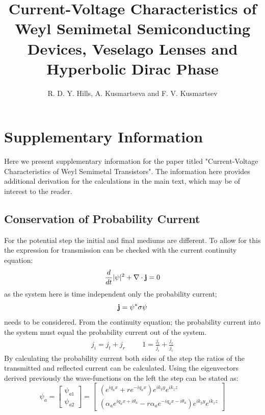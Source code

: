 \documentclass[12pt,a4paper]{article}
\title{Current-Voltage Characteristics of Weyl Semimetal Semiconducting Devices, Veselago Lenses and Hyperbolic Dirac Phase}
\author{R. D. Y. Hills, A. Kusmartseva and F. V. Kusmartsev}
\begin{document}
\maketitle
	\section{Supplementary Information}
	Here we present supplementary information for the paper titled "Current-Voltage Characteristics of Weyl Semimetal Transistors". The information here provides additional derivation for the calculations in the main text, which may be of interest to the reader.
		\subsection{Conservation of Probability Current}
		\label{Potential Step - Conservation of Probability Current}
			For the potential step the initial and final mediums are different. To allow for this the expression for transmission can be checked with the current continuity equation:
		\begin{equation}
			\frac{d}{dt}|\psi|^{2}+\nabla\cdot {\bf j}=0
		\end{equation}
		as the system here is time independent only the probability current;
		\begin{equation}
			{\bf j} =\psi^{*} {\bf \sigma} \psi
		\end{equation}
		needs to be considered. From the continuity equation; the probability current into the system must equal the probability current out of the system.
		\begin{align}
			j_{i}=j_{t}+j_{r}
			\hspace{1cm}
			1=\frac{j_{t}}{j_{i}}+\frac{j_{r}}{j_{i}}
		\end{align}
		By calculating the probability current both sides of the step the ratios of the transmitted and reflected current can be calculated. Using the eigenvectors derived previously the wave-functions on the left the step can be stated as:
		\begin{equation}
			\psi_{a}=
			\left[\begin{array}{ccc}
				\psi_{a1}\\
				\psi_{a2}
			\end{array}\right]
			=
			\left[\begin{array}{ccc}
				\left(e^{iq_{a}x}+re^{-iq_{a}x}\right)e^{ik_{y}y}e^{ik_{z}z}\\
				\left(\alpha_{a}e^{iq_{a}x+i\theta_{a}}-r\alpha_{a}e^{-iq_{a}x-i\theta_{a}}\right)e^{ik_{y}y}e^{ik_{z}z}
			\end{array}\right]
		\end{equation}
\end{document}
